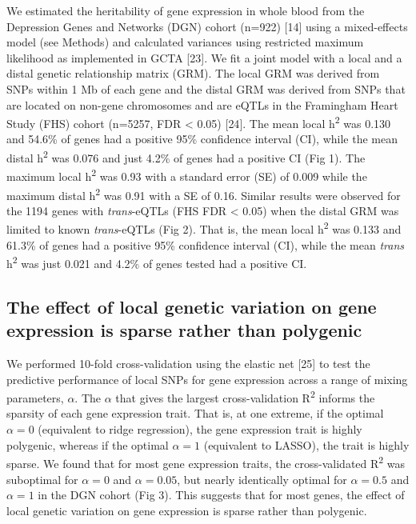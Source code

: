 \documentclass[]{article}
\begin{document}
We estimated the heritability of gene expression in whole blood from the
Depression Genes and Networks (DGN) cohort (n=922) {[}14{]} using a
mixed-effects model (see Methods) and calculated variances using
restricted maximum likelihood as implemented in GCTA {[}23{]}. We fit a
joint model with a local and a distal genetic relationship matrix (GRM).
The local GRM was derived from SNPs within 1 Mb of each gene and the
distal GRM was derived from SNPs that are located on non-gene
chromosomes and are eQTLs in the Framingham Heart Study (FHS) cohort
(n=5257, FDR \textless{} 0.05) {[}24{]}. The mean local
h\textsuperscript{2} was 0.130 and 54.6\% of genes had a positive 95\%
confidence interval (CI), while the mean distal h\textsuperscript{2} was
0.076 and just 4.2\% of genes had a positive CI (Fig 1). The maximum
local h\textsuperscript{2} was 0.93 with a standard error (SE) of 0.009
while the maximum distal h\textsuperscript{2} was 0.91 with a SE of
0.16. Similar results were observed for the 1194 genes with
\emph{trans}-eQTLs (FHS FDR \textless{} 0.05) when the distal GRM was
limited to known \emph{trans}-eQTLs (Fig 2). That is, the mean local
h\textsuperscript{2} was 0.133 and 61.3\% of genes had a positive 95\%
confidence interval (CI), while the mean \emph{trans}
h\textsuperscript{2} was just 0.021 and 4.2\% of genes tested had a
positive CI.

\subsection{The effect of local genetic variation on gene expression is
sparse rather than
polygenic}\label{the-effect-of-local-genetic-variation-on-gene-expression-is-sparse-rather-than-polygenic}

We performed 10-fold cross-validation using the elastic net {[}25{]} to
test the predictive performance of local SNPs for gene expression across
a range of mixing parameters, \(\alpha\). The \(\alpha\) that gives the
largest cross-validation R\textsuperscript{2} informs the sparsity of
each gene expression trait. That is, at one extreme, if the optimal
\(\alpha=0\) (equivalent to ridge regression), the gene expression trait
is highly polygenic, whereas if the optimal \(\alpha=1\) (equivalent to
LASSO), the trait is highly sparse. We found that for most gene
expression traits, the cross-validated R\textsuperscript{2} was
suboptimal for \(\alpha=0\) and \(\alpha=0.05\), but nearly identically
optimal for \(\alpha=0.5\) and \(\alpha=1\) in the DGN cohort (Fig 3).
This suggests that for most genes, the effect of local genetic variation
on gene expression is sparse rather than polygenic.
\end{document}
